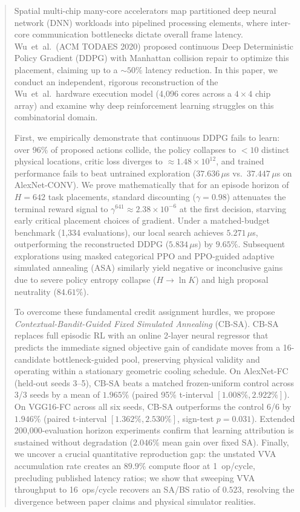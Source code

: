 \documentclass[10pt,conference]{IEEEtran}
\begin{document}
\begin{abstract}
Spatial multi-chip many-core accelerators map partitioned deep neural network (DNN) workloads into pipelined processing elements, where inter-core communication bottlenecks dictate overall frame latency. Wu~et~al.\ (ACM TODAES 2020) proposed continuous Deep Deterministic Policy Gradient (DDPG) with Manhattan collision repair to optimize this placement, claiming up to a ${\sim}50\%$ latency reduction. In this paper, we conduct an independent, rigorous reconstruction of the Wu~et~al.\ hardware execution model (4,096 cores across a $4{\times}4$ chip array) and examine why deep reinforcement learning struggles on this combinatorial domain.

First, we empirically demonstrate that continuous DDPG fails to learn: over $96\%$ of proposed actions collide, the policy collapses to $<10$ distinct physical locations, critic loss diverges to $\approx 1.48 \times 10^{12}$, and trained performance fails to beat untrained exploration ($37.636\,\mu$s vs.\ $37.447\,\mu$s on AlexNet-CONV). We prove mathematically that for an episode horizon of $H = 642$ task placements, standard discounting ($\gamma = 0.98$) attenuates the terminal reward signal to $\gamma^{641} \approx 2.38 \times 10^{-6}$ at the first decision, starving early critical placement choices of gradient. Under a matched-budget benchmark (1,334 evaluations), our local search achieves $5.271\,\mu$s, outperforming the reconstructed DDPG ($5.834\,\mu$s) by $9.65\%$. Subsequent explorations using masked categorical PPO and PPO-guided adaptive simulated annealing (ASA) similarly yield negative or inconclusive gains due to severe policy entropy collapse ($H \to \ln K$) and high proposal neutrality ($84.61\%$).

To overcome these fundamental credit assignment hurdles, we propose \emph{Contextual-Bandit-Guided Fixed Simulated Annealing} (CB-SA). CB-SA replaces full episodic RL with an online 2-layer neural regressor that predicts the immediate signed objective gain of candidate moves from a 16-candidate bottleneck-guided pool, preserving physical validity and operating within a stationary geometric cooling schedule. On AlexNet-FC (held-out seeds 3--5), CB-SA beats a matched frozen-uniform control across 3/3 seeds by a mean of $1.965\%$ (paired 95\% t-interval $[1.008\%, 2.922\%]$). On VGG16-FC across all six seeds, CB-SA outperforms the control 6/6 by $1.946\%$ (paired t-interval $[1.362\%, 2.530\%]$, sign-test $p=0.031$). Extended 200,000-evaluation horizon experiments confirm that learning attribution is sustained without degradation ($2.046\%$ mean gain over fixed SA). Finally, we uncover a crucial quantitative reproduction gap: the unstated VVA accumulation rate creates an $89.9\%$ compute floor at 1~op/cycle, precluding published latency ratios; we show that sweeping VVA throughput to 16~ops/cycle recovers an SA/BS ratio of $0.523$, resolving the divergence between paper claims and physical simulator realities.
\end{abstract}
\end{document}
